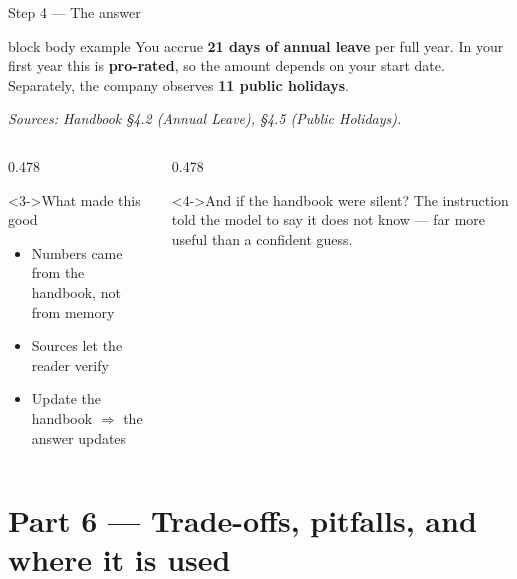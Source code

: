 \documentclass[aspectratio=169,11pt]{beamer}
\begin{document}
\begin{frame}{Step 4 --- The answer}
  \begin{beamercolorbox}[sep=9pt,rounded=true]{block body example}
    You accrue \textbf{21 days of annual leave} per full year. In your first
    year this is \textbf{pro-rated}, so the amount depends on your start
    date. Separately, the company observes \textbf{11 public holidays}.
    \medskip

    \small\emph{Sources: Handbook \S4.2 (Annual Leave), \S4.5 (Public
    Holidays).}
  \end{beamercolorbox}
  \bigskip
  \begin{columns}[T,onlytextwidth]
    \begin{column}{0.478\textwidth}
      \begin{block}<3->{What made this good}
        \begin{itemize}
          \item Numbers came from the handbook, not from memory
          \item Sources let the reader verify
          \item Update the handbook $\Rightarrow$ the answer updates
        \end{itemize}
      \end{block}
    \end{column}
    \begin{column}{0.478\textwidth}
      \begin{exampleblock}<4->{And if the handbook were silent?}
        The instruction told the model to say it does not know --- far more
        useful than a confident guess.
      \end{exampleblock}
    \end{column}
  \end{columns}
\end{frame}

\section{Part 6 --- Trade-offs, pitfalls, and where it is used}
\end{document}
